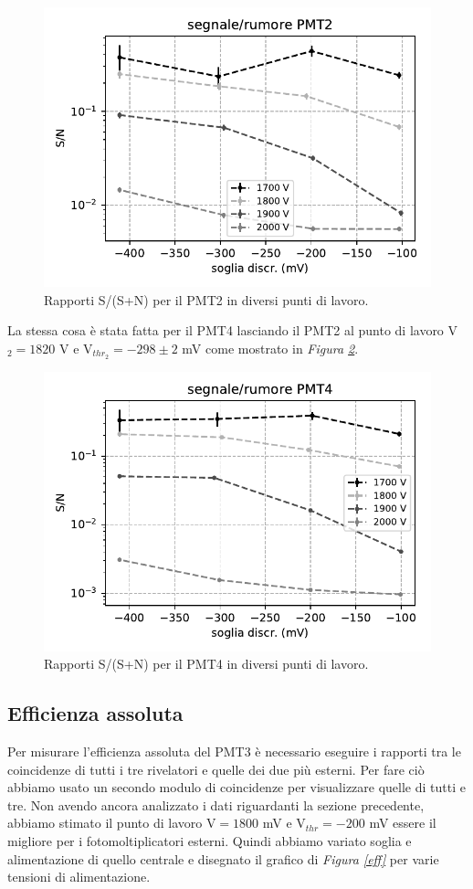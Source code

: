\documentclass[a4paper]{article}
\begin{document}
\begin{figure}[h]
\centering
\includegraphics[width=8 cm]{calib_pmt2}
\caption{Rapporti S/(S+N) per il PMT2 in diversi punti di lavoro.}
\label{test1}
\end{figure}

La stessa cosa è stata fatta per il PMT4 lasciando il PMT2 al punto di lavoro V$_2=1820$\! V e V$_{thr_2}=-298\pm2$\! mV come mostrato in \emph{Figura \ref{test2}}.

\begin{figure}[h]
\centering
\includegraphics[width=8 cm]{calib_pmt4}
\caption{Rapporti S/(S+N) per il PMT4 in diversi punti di lavoro.}
\label{test2}
\end{figure}

\subsection*{Efficienza assoluta}

Per misurare l'efficienza assoluta del PMT3 è necessario eseguire i rapporti tra le coincidenze di tutti i tre rivelatori e quelle dei due più esterni. Per fare ciò abbiamo usato un secondo modulo di coincidenze per visualizzare quelle di tutti e tre. Non avendo ancora analizzato i dati riguardanti la sezione precedente, abbiamo stimato il punto di lavoro V$=1800$\! mV e V$_{thr}=-200$\! mV essere il migliore per i fotomoltiplicatori esterni. Quindi abbiamo variato soglia e alimentazione di quello centrale e disegnato il grafico di \emph{Figura \ref{eff}} per varie tensioni di alimentazione.
\end{document}

